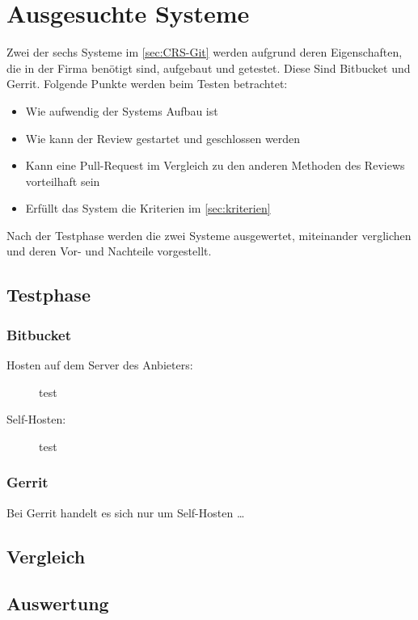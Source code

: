\section{Ausgesuchte Systeme}
\label{sec:Ausgesuchte Systeme}

Zwei der sechs Systeme im \cref{sec:CRS-Git} werden aufgrund deren Eigenschaften, die in der Firma benötigt sind, aufgebaut und getestet. Diese Sind Bitbucket und Gerrit.
Folgende Punkte werden beim Testen betrachtet:
\begin{itemize}
	\item Wie aufwendig der Systems Aufbau ist
	\item Wie kann der Review gestartet und geschlossen werden
	\item Kann eine Pull-Request im Vergleich zu den anderen Methoden des Reviews vorteilhaft sein
	\item Erfüllt das System die Kriterien im \cref{sec:kriterien}
\end{itemize}

Nach der Testphase werden die zwei Systeme ausgewertet, miteinander verglichen und deren Vor- und Nachteile vorgestellt.

\subsection{Testphase}
\label{subsec:testphase}


\subsubsection{Bitbucket}
\label{subsubsec:Test_Bitbucket}

\begin{description}
	\item [Hosten auf dem Server des Anbieters:]
	test
	
	
	\item [Self-Hosten:]
	test
\end{description}


\subsubsection{Gerrit}
\label{subsubsec:Test_Gerrit}

Bei Gerrit handelt es sich nur um Self-Hosten \dots

\subsection{Vergleich}
\label{subsec:Vergleich_Bitbucket_Gerrit}


\subsection{Auswertung}
\label{subsec:Auswertung}
